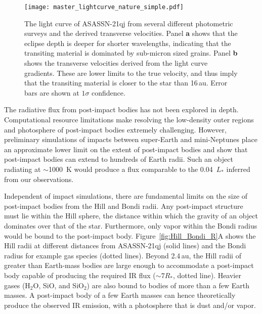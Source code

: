 \documentclass[sn-nature]{sn-jnl}%
\begin{document}
\begin{figure*}
\begin{centering}
\texttt{[image: master\_lightcurve\_nature\_simple.pdf]}
      \caption{The light curve of ASASSN-21qj from several different photometric surveys and the derived transverse velocities.
      Panel {\bf a} shows that the eclipse depth is deeper for shorter wavelengths, indicating that the transiting material is dominated by sub-micron sized grains.
      Panel {\bf b} shows the  transverse velocities derived from the light curve gradients.
      These are lower limits to the true velocity, and thus imply that the transiting material is closer to the star than 16\,au.
      Error bars are shown at $1\sigma$ confidence.
      }
        \label{fig:eclipse_overview}
\end{centering}
\end{figure*}




The radiative flux from post-impact bodies has not been explored in depth.
%
Computational resource limitations make resolving the low-density outer regions and photosphere of post-impact bodies extremely challenging.
%
However, preliminary simulations of impacts between super-Earth and mini-Neptunes place an approximate lower limit on the extent of post-impact bodies and show that post-impact bodies can extend to hundreds of Earth radii.
%
Such an object radiating at $\sim$1000~K would produce a flux comparable to the 0.04~$L_*$ inferred from our observations. 

Independent of impact simulations, there are fundamental limits on the size of post-impact bodies from the Hill and Bondi radii.
%
Any post-impact structure must lie within the Hill sphere, the distance within which the gravity of an object dominates over that of the star.
%
Furthermore, only vapor within the Bondi radius would be bound to the post-impact body.
%
Figure~\ref{fig:Hill_Bondi_R}A shows the Hill radii at different distances from ASASSN-21qj (solid lines) and the Bondi radius for example gas species (dotted lines).
%
Beyond 2.4\,au, the Hill radii of greater than Earth-mass bodies are large enough to accommodate a post-impact body capable of producing the required IR flux ($\sim7R_*$, dotted line). 
%
Heavier gases (H$_2$O, SiO, and SiO$_2$) are also bound to bodies of more than a few Earth masses.
%
A post-impact body of a few Earth masses can hence theoretically produce the observed IR emission, with a photosphere that is dust and/or vapor.
\end{document}

